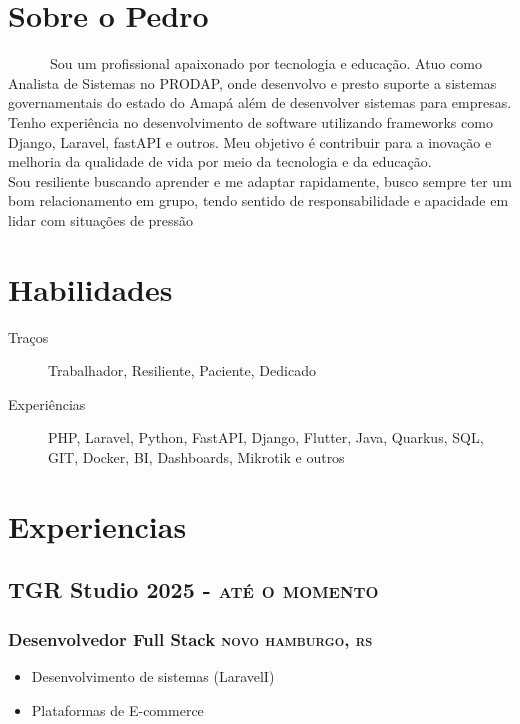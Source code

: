 \documentclass{article}
\newcommand{\rside}[1]{\hfill \normalfont\scshape\MakeLowercase{#1}}
\begin{document}
\section{\faUser\enspace Sobre o Pedro}
\begin{description}
  \item \ \ \ \ \ \  Sou um profissional apaixonado por tecnologia e educação. Atuo como Analista de Sistemas no PRODAP, onde desenvolvo e presto suporte a sistemas governamentais do estado do Amapá além de desenvolver sistemas para empresas. Tenho experiência no desenvolvimento de software utilizando frameworks como Django, Laravel, fastAPI e outros. Meu objetivo é contribuir para a inovação e melhoria da qualidade de vida por meio da tecnologia e da educação. \\ Sou resiliente buscando aprender e me adaptar rapidamente, busco sempre ter um bom relacionamento em grupo, tendo sentido de responsabilidade e apacidade em lidar com situações de pressão
\end{description}

\section{\faCogs\enspace Habilidades}
\begin{description}
  \item[Traços] Trabalhador, Resiliente, Paciente, Dedicado
  \item[Experiências] PHP, Laravel, Python, FastAPI, Django, Flutter, Java, Quarkus, SQL, GIT, Docker, BI, Dashboards, Mikrotik e outros
\end{description}

\section{\faChartPie\enspace Experiencias}

\subsection{TGR Studio \rside{2025 - Até o momento}}
\subsubsection{Desenvolvedor Full Stack  \rside{Novo Hamburgo, RS}}
\begin{itemize}
  \item Desenvolvimento de sistemas (LaravelI)
  \item Plataformas de E-commerce
\end{itemize}
\end{document}
